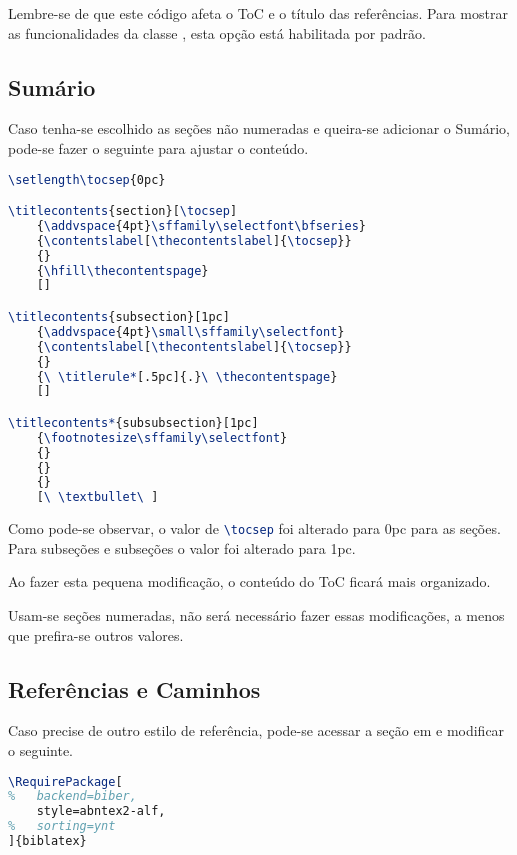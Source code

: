         Lembre-se de que este código afeta o ToC e o título das referências. Para mostrar as funcionalidades da classe , esta opção está habilitada por padrão.

    \subsection{Sumário}
    
        Caso  tenha-se escolhido as seções não numeradas e queira-se adicionar o Sumário,  pode-se fazer o seguinte para ajustar o conteúdo.

\nolinenumbers
\begin{lstlisting}[language=TeX, caption=ToC quando seção não numerada é escolhida.]
\setlength\tocsep{0pc}

\titlecontents{section}[\tocsep]
    {\addvspace{4pt}\sffamily\selectfont\bfseries}
    {\contentslabel[\thecontentslabel]{\tocsep}}
    {}
    {\hfill\thecontentspage}
    []

\titlecontents{subsection}[1pc]
    {\addvspace{4pt}\small\sffamily\selectfont}
    {\contentslabel[\thecontentslabel]{\tocsep}}
    {}
    {\ \titlerule*[.5pc]{.}\ \thecontentspage}
    []

\titlecontents*{subsubsection}[1pc]
    {\footnotesize\sffamily\selectfont}
    {}
    {}
    {}
    [\ \textbullet\ ]
\end{lstlisting}
\linenumbers

        Como pode-se observar, o valor de \lstinline[language=TeX]|\tocsep| foi alterado para 0pc para as seções. Para subseções e subseções o valor foi alterado para 1pc.

        Ao fazer esta pequena modificação, o conteúdo do ToC ficará mais organizado.

        Usam-se seções numeradas, não será necessário fazer essas modificações, a menos que prefira-se outros valores.

    \subsection{Referências e Caminhos}

        Caso precise de outro estilo de referência, pode-se acessar a seção  em  e modificar o seguinte.

\nolinenumbers
\begin{lstlisting}[language=TeX, caption=Estilo de referência.]
\RequirePackage[
% 	backend=biber,
	style=abntex2-alf,
% 	sorting=ynt
]{biblatex}
\end{lstlisting}
\linenumbers

